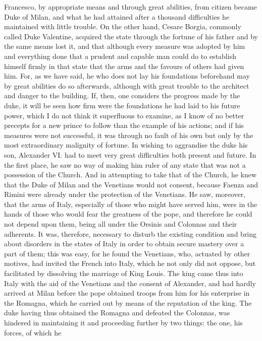 \documentclass[12pt,letterpaper]{memoir}
\begin{document}
Francesco, by appropriate means and through great abilities, from
citizen became Duke of Milan, and what he had attained after a thousand
difficulties he maintained with little trouble. On the other hand,
Cesare Borgia, commonly called Duke Valentine, acquired the state
through the fortune of his father and by the same means lost it, and
that although every measure was adopted by him and everything done
that a prudent and capable man could do to establish himself firmly
in that state that the arms and the favours of others had given him.
For, as we have said, he who does not lay his foundations beforehand
may by great abilities do so afterwards, although with great trouble
to the architect and danger to the building. If, then, one considers
the progress made by the duke, it will be seen how firm were the
foundations he had laid to his future power, which I do not think it
superfluous to examine, as I know of no better precepts for a new
prince to follow than the example of his actions; and if his measures
were not successful, it was through no fault of his own but only by
the most extraordinary malignity of fortune. In wishing to aggrandise
the duke his son, Alexander VI. had to meet very great difficulties
both present and future. In the first place, he saw no way of making
him ruler of any state that was not a possession of the Church. And in
attempting to take that of the Church, he knew that the Duke of Milan
and the Venetians would not consent, because Faenza and Rimini were
already under the protection of the Venetians. He saw, moreover, that
the arms of Italy, especially of those who might have served him, were
in the hands of those who would fear the greatness of the pope, and
therefore he could not depend upon them, being all under the Orsinis
and Colonnas and their adherents. It was, therefore, necessary to
disturb the existing condition and bring about disorders in the states
of Italy in order to obtain secure mastery over a part of them; this
was easy, for he found the Venetians, who, actuated by other motives,
had invited the French into Italy, which he not only did not oppose,
but facilitated by dissolving the marriage of King Louis. The king
came thus into Italy with the aid of the Venetians and the consent of
Alexander, and had hardly arrived at Milan before the pope obtained
troops from him for his enterprise in the Romagna, which he carried out
by means of the reputation of the king. The duke having thus obtained
the Romagna and defeated the Colonnas, was hindered in maintaining it
and proceeding further by two things: the one, his forces, of which he
\end{document}
